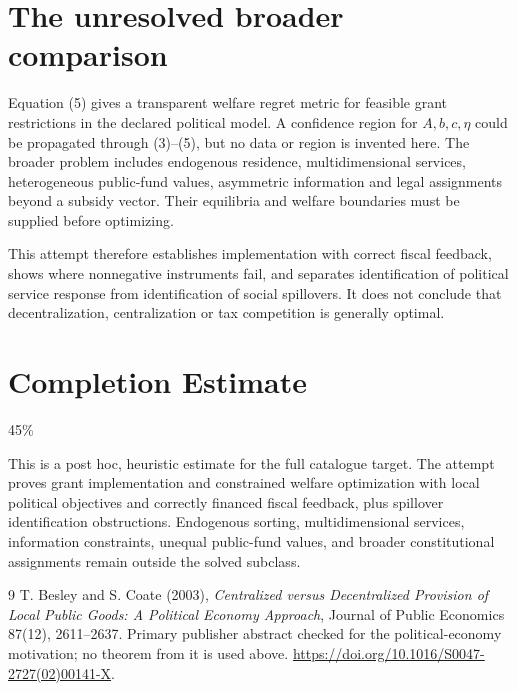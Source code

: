 \documentclass[11pt,a4paper]{article}
\begin{document}
\section{The unresolved broader comparison}
Equation (5) gives a transparent welfare regret metric for feasible grant restrictions in the declared political model. A confidence region for $A,b,c,\eta$ could be propagated through (3)--(5), but no data or region is invented here. The broader problem includes endogenous residence, multidimensional services, heterogeneous public-fund values, asymmetric information and legal assignments beyond a subsidy vector. Their equilibria and welfare boundaries must be supplied before optimizing.

This attempt therefore establishes implementation with correct fiscal feedback, shows where nonnegative instruments fail, and separates identification of political service response from identification of social spillovers. It does not conclude that decentralization, centralization or tax competition is generally optimal.

\section{Completion Estimate}
45\%

This is a post hoc, heuristic estimate for the full catalogue target.
The attempt proves grant implementation and constrained welfare optimization with local political objectives and correctly financed fiscal feedback, plus spillover identification obstructions. Endogenous sorting, multidimensional services, information constraints, unequal public-fund values, and broader constitutional assignments remain outside the solved subclass.

\begin{thebibliography}{9}
 T. Besley and S. Coate (2003), \emph{Centralized versus Decentralized Provision of Local Public Goods: A Political Economy Approach}, Journal of Public Economics 87(12), 2611--2637. Primary publisher abstract checked for the political-economy motivation; no theorem from it is used above. \url{https://doi.org/10.1016/S0047-2727(02)00141-X}.
\end{thebibliography}
\end{document}
